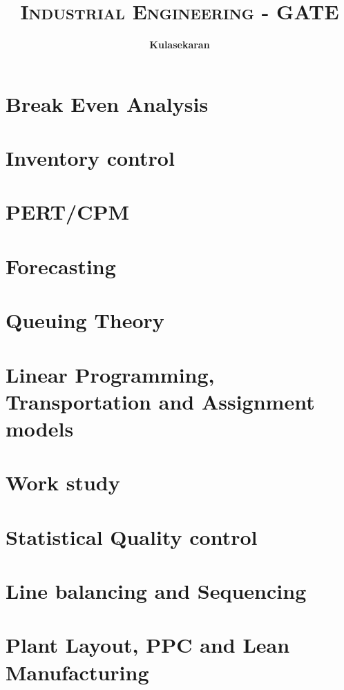 \documentclass[8pt]{report}
\title{\Huge{\textsc{Industrial Engineering - GATE}}}
\author{\huge{\textbf{Kulasekaran}}}
\begin{document}
\maketitle
\tableofcontents
\chapter{Break Even Analysis}
\chapter{Inventory control}
\chapter{PERT/CPM}
\chapter{Forecasting}
\chapter{Queuing Theory}
\chapter{Linear Programming, Transportation and Assignment models}
\chapter{Work study}
\chapter{Statistical Quality control}
\chapter{Line balancing and Sequencing}
\chapter{Plant Layout, PPC and Lean Manufacturing}
\end{document}
